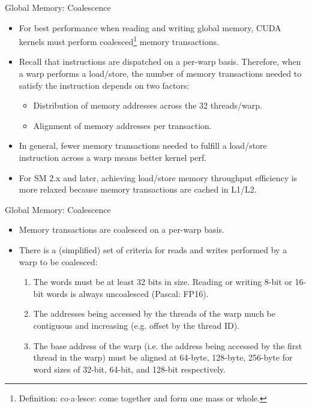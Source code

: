 \documentclass[handout]{beamer}
\begin{document}
\begin{frame}{Global Memory: Coalescence}
\begin{itemize}
	\item<1->For best performance when reading and writing global memory, CUDA kernels must perform coalesced\footnote{Definition: co$\cdot$a$\cdot$lesce: come together and form one mass or whole.\hfill\break} memory transactions.
	\item<1->Recall that instructions are dispatched on a per-warp basis.  Therefore, when a warp performs a load/store, the number of memory transactions needed to satisfy the instruction depends on two factors:
	\begin{itemize}
		\item<1->Distribution of memory addresses across the 32 threads/warp.
		\item<1->Alignment of memory addresses per transaction.
	\end{itemize} 
	\item<1->In general, fewer memory transactions needed to fulfill a load/store instruction across a warp means better kernel perf. 
	\item<1->For SM 2.x and later, achieving load/store memory throughput efficiency is more relaxed because memory transactions are cached in L1/L2. 
\end{itemize}
\end{frame}

\begin{frame}{Global Memory: Coalescence}
\begin{itemize}
\itemsep1em
	\item<1->Memory transactions are coalesced on a per-warp basis.
	\item<1->There is a (simplified) set of criteria for reads and writes performed by a warp to be coalesced:
	\hfill\break
	\begin{enumerate}
	\itemsep1em
		\item<1->The words must be at least 32 bits in size.  Reading or writing 8-bit or 16-bit words is always uncoalesced (Pascal: FP16).
		\item<1->The addresses being accessed by the threads of the warp much be contiguous and increasing (e.g. offset by the thread ID).
		\item<1->The base address of the warp (i.e. the address being accessed by the first thread in the warp) must be aligned at 64-byte, 128-byte, 256-byte for word sizes of 32-bit, 64-bit, and 128-bit respectively. 
	\end{enumerate}
\end{itemize}

\end{frame}
\end{document}
